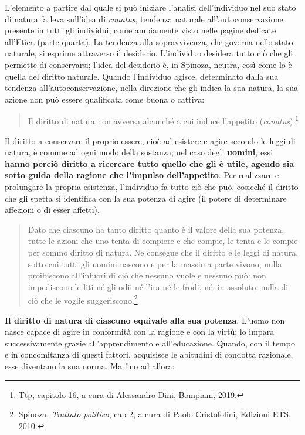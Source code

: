 L’elemento a partire dal quale si può iniziare l’analisi dell’individuo nel suo stato di natura
fa leva sull’idea di \textit{conatus}, tendenza naturale all’autoconservazione presente in tutti gli individui, come ampiamente visto nelle pagine dedicate all'Etica (parte quarta). La tendenza alla sopravvivenza, che governa nello stato naturale, si
esprime attraverso il desiderio. L’individuo desidera tutto ciò che gli permette
di conservarsi; l’idea del desiderio è, in Spinoza, neutra, così
come lo è quella del diritto naturale. Quando l’individuo agisce, determinato
dalla sua tendenza all’autoconservazione, nella direzione che gli indica la sua
natura, la sua azione non può essere qualificata come buona o cattiva:

\begin{quotation}
	\small Il diritto di natura non avversa alcunché a cui induce l'appetito (\textit{conatus}).\footnote{Ttp, capitolo 16, a cura di Alessandro Dini, Bompiani, 2019.}
\end{quotation}

Il diritto a conservare il proprio essere, cioè ad esistere e agire secondo le leggi di natura, è comune ad ogni modo della sostanza; nel caso degli\textbf{ uomini}, essi \textbf{hanno perciò diritto a ricercare tutto quello che gli è utile, agendo sia sotto guida della ragione che l'impulso dell'appetito}. Per realizzare e prolungare la propria esistenza, l’individuo fa tutto ciò che
può, cosicché il diritto che gli spetta si identifica con la sua potenza di agire (il potere di determinare affezioni o di esser affetti).

\begin{quotation}
	\small Dato che ciascuno ha tanto diritto quanto è il valore della sua potenza, tutte
	le azioni che uno tenta di compiere e che compie, le tenta e le compie per sommo
	diritto di natura. Ne consegue che il diritto e le leggi di natura, sotto cui tutti gli
	uomini nascono e per la massima parte vivono, nulla proibiscono all’infuori di ciò
	che nessuno vuole e nessuno può: non impediscono le liti né gli odii né l’ira né le
	frodi, né, in assoluto, nulla di ciò che le voglie suggeriscono.\footnote{Spinoza, \textit{Trattato politico}, cap 2, a cura di Paolo Cristofolini, 
		Edizioni ETS, 2010.}
	
\end{quotation}

\textbf{Il diritto di natura di ciascuno equivale alla sua potenza}. L’uomo
non nasce capace di agire in conformità con la ragione e con la virtù; lo impara successivamente grazie all’apprendimento e all’educazione. Quando, con il tempo
e in concomitanza di questi fattori, acquisisce le abitudini di condotta razionale,
esse diventano la sua norma. Ma fino ad allora:

